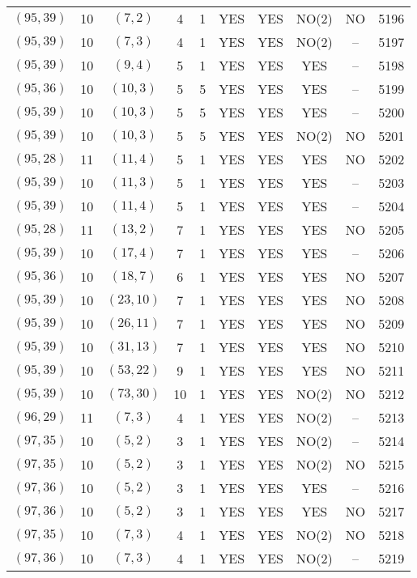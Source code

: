 \begin{longtable}{|c|c|c|c|c|c|c|c|c|c|}
$(95, 39)$ & 10 & $(7, 2)$ & 4 & 1 & YES & YES & NO(2) & NO & 5196\\
$(95, 39)$ & 10 & $(7, 3)$ & 4 & 1 & YES & YES & NO(2) & -- & 5197\\
$(95, 39)$ & 10 & $(9, 4)$ & 5 & 1 & YES & YES & YES & -- & 5198\\
$(95, 36)$ & 10 & $(10, 3)$ & 5 & 5 & YES & YES & YES & -- & 5199\\
$(95, 39)$ & 10 & $(10, 3)$ & 5 & 5 & YES & YES & YES & -- & 5200\\
$(95, 39)$ & 10 & $(10, 3)$ & 5 & 5 & YES & YES & NO(2) & NO & 5201\\
$(95, 28)$ & 11 & $(11, 4)$ & 5 & 1 & YES & YES & YES & NO & 5202\\
$(95, 39)$ & 10 & $(11, 3)$ & 5 & 1 & YES & YES & YES & -- & 5203\\
$(95, 39)$ & 10 & $(11, 4)$ & 5 & 1 & YES & YES & YES & -- & 5204\\
$(95, 28)$ & 11 & $(13, 2)$ & 7 & 1 & YES & YES & YES & NO & 5205\\
$(95, 39)$ & 10 & $(17, 4)$ & 7 & 1 & YES & YES & YES & -- & 5206\\
$(95, 36)$ & 10 & $(18, 7)$ & 6 & 1 & YES & YES & YES & NO & 5207\\
$(95, 39)$ & 10 & $(23, 10)$ & 7 & 1 & YES & YES & YES & NO & 5208\\
$(95, 39)$ & 10 & $(26, 11)$ & 7 & 1 & YES & YES & YES & NO & 5209\\
$(95, 39)$ & 10 & $(31, 13)$ & 7 & 1 & YES & YES & YES & NO & 5210\\
$(95, 39)$ & 10 & $(53, 22)$ & 9 & 1 & YES & YES & YES & NO & 5211\\
$(95, 39)$ & 10 & $(73, 30)$ & 10 & 1 & YES & YES & NO(2) & NO & 5212\\
$(96, 29)$ & 11 & $(7, 3)$ & 4 & 1 & YES & YES & NO(2) & -- & 5213\\
$(97, 35)$ & 10 & $(5, 2)$ & 3 & 1 & YES & YES & NO(2) & -- & 5214\\
$(97, 35)$ & 10 & $(5, 2)$ & 3 & 1 & YES & YES & NO(2) & NO & 5215\\
$(97, 36)$ & 10 & $(5, 2)$ & 3 & 1 & YES & YES & YES & -- & 5216\\
$(97, 36)$ & 10 & $(5, 2)$ & 3 & 1 & YES & YES & YES & NO & 5217\\
$(97, 35)$ & 10 & $(7, 3)$ & 4 & 1 & YES & YES & NO(2) & NO & 5218\\
$(97, 36)$ & 10 & $(7, 3)$ & 4 & 1 & YES & YES & NO(2) & -- & 5219\\

\end{longtable}
